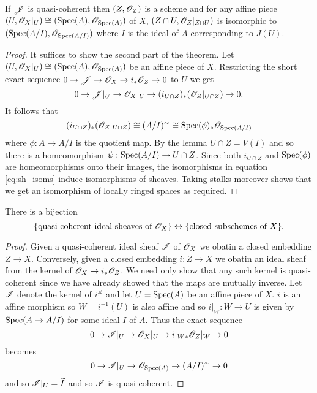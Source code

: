 \documentclass{memoir}
\begin{document}
\begin{thm}
    \label{thm:sheaf_of_ideals}
    If $\mathscr{J}$ is quasi-coherent then $(Z,\mathscr{O}_Z)$ is a scheme and for any affine piece $(U,\mathscr{O}_X|_U) \cong (\operatorname{Spec}(A),\mathscr{O}_{\operatorname{Spec}(A)})$ of $X$, $(Z\cap U,\mathscr{O}_Z|_{Z\cap U})$ is isomorphic to $(\operatorname{Spec}(A/I),\mathscr{O}_{\operatorname{Spec}(A/I)})$ where $I$ is the ideal of $A$ corresponding to $J(U)$.
\end{thm}
\begin{proof}
    It suffices to show the second part of the theorem.
    Let $(U,\mathscr{O}_X|_U) \cong (\operatorname{Spec}(A),\mathscr{O}_{\operatorname{Spec}(A)})$ be an affine piece of $X$.
    Restricting the short exact sequence $0\to\mathscr{J}\to\mathscr{O}_X\to i_*\mathscr{O}_Z\to 0$ to $U$ we get
    \begin{equation}
        0\to\mathscr{J}|_U \to\mathscr{O}_X|_U \to (i_{U\cap Z})_*(\mathscr{O}_Z|_{U\cap Z})\to 0.
    \end{equation}
    It follows that 
    \begin{equation}
        \label{eq:sh_isoms}
        (i_{U\cap Z})_*(\mathscr{O}_Z|_{U\cap Z}) \cong (A/I)^\sim \cong \operatorname{Spec}(\phi)_*\mathscr{O}_{\operatorname{Spec}(A/I)}
    \end{equation}
    where $\phi:A\to A/I$ is the quotient map.
    By the lemma $U\cap Z = V(I)$ and so there is a homeomorphism $\psi:\operatorname{Spec}(A/I)\to U\cap Z$.
    Since both $i_{U\cap Z}$ and $\operatorname{Spec}(\phi)$ are homeomorphisms onto their images, the isomorphisms in equation \ref{eq:sh_isoms} induce isomorphisms of sheaves.
    Taking stalks moreover shows that we get an isomorphism of locally ringed spaces as required.
\end{proof}
\begin{thm}
    \label{thm:ideal-subsch}
    There is a bijection
    \begin{equation}
        \lbrace\text{quasi-coherent ideal sheaves of } \mathscr{O}_X\rbrace \leftrightarrow \lbrace\text{closed subschemes of } X\rbrace.
    \end{equation}
\end{thm}
\begin{proof}
    Given a quasi-coherent ideal sheaf $\mathscr{I}$ of $\mathscr{O}_X$ we obatin a closed embedding $Z\to X$.
    Conversely, given a closed embedding $i:Z\to X$ we obatin an ideal sheaf from the kernel of $\mathscr{O}_X\to i_*\mathscr{O}_Z$.
    We need only show that any such kernel is quasi-coherent since we have already showed that the maps are mutually inverse.
    Let $\mathscr{I}$ denote the kernel of $i^\#$ and let $U = \operatorname{Spec}(A)$ be an affine piece of $X$.
    $i$ is an affine morphism so $W = i^{-1}(U)$ is also affine and so $i|_W:W\to U$ is given by $\operatorname{Spec}(A\to A/I)$ for some ideal $I$ of $A$.
    Thus the exact sequence 
    \begin{equation}
        0 \to \mathscr{I}|_U \to \mathscr{O}_X|_U \to i|_{W*}\mathscr{O}_Z|_W \to 0
    \end{equation}
    becomes
    \begin{equation}
        0 \to \mathscr{I}|_U \to \mathscr{O}_{\operatorname{Spec}(A)} \to (A/I)^\sim \to 0
    \end{equation}
    and so $\mathscr{I}|_U = \widetilde I$ and so $\mathscr{I}$ is quasi-coherent.
\end{proof}
\end{document}
